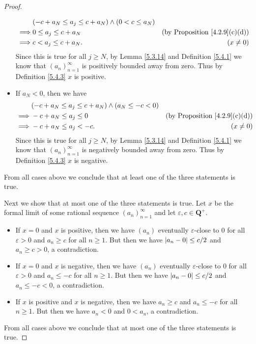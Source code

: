 \begin{proof}
\begin{itemize}
              \begin{align*}
                           & (-c + a_N \leq a_j \leq c + a_N) \land (0 < c \leq a_N)                                             \\
                  \implies & 0 \leq a_j \leq c + a_N                                 & \text{(by Proposition \ref{4.2.9}(c)(d))} \\
                  \implies & c < a_j \leq c + a_N.                                   & (x \neq 0)
              \end{align*}
              Since this is true for all \(j \geq N\), by Lemma \ref{5.3.14} and Definition \ref{5.4.1} we know that \((a_n)_{n = 1}^\infty\) is positively bounded away from zero.
              Thus by Definition \ref{5.4.3} \(x\) is positive.
        \item If \(a_N < 0\), then we have
              \begin{align*}
                           & (-c + a_N \leq a_j \leq c + a_N) \land (a_N \leq -c < 0)                                             \\
                  \implies & -c + a_N \leq a_j \leq 0                                 & \text{(by Proposition \ref{4.2.9}(c)(d))} \\
                  \implies & -c + a_N \leq a_j < -c.                                  & (x \neq 0)
              \end{align*}
              Since this is true for all \(j \geq N\), by Lemma \ref{5.3.14} and Definition \ref{5.4.1} we know that \((a_n)_{n = 1}^\infty\) is negatively bounded away from zero.
              Thus by Definition \ref{5.4.3} \(x\) is negative.
    \end{itemize}
    From all cases above we conclude that at least one of the three statements is true.

    Next we show that at most one of the three statements is true.
    Let \(x\) be the formal limit of some rational sequence \((a_n)_{n = 1}^{\infty}\) and let \(\varepsilon, c \in \mathbf{Q}^+\).
    \begin{itemize}
        \item If \(x = 0\) and \(x\) is positive, then we have \((a_n)\) eventually \(\varepsilon\)-close to \(0\) for all \(\varepsilon > 0\) and \(a_n \geq c\) for all \(n \geq 1\).
              But then we have \(\abs*{a_n - 0} \leq c / 2\) and \(a_n \geq c > 0\), a contradiction.
        \item If \(x = 0\) and \(x\) is negative, then we have \((a_n)\) eventually \(\varepsilon\)-close to \(0\) for all \(\varepsilon > 0\) and \(a_n \leq -c\) for all \(n \geq 1\).
              But then we have \(\abs*{a_n - 0} \leq c / 2\) and \(a_n \leq -c < 0\), a contradiction.
        \item If \(x\) is positive and \(x\) is negative, then we have \(a_n \geq c\) and \(a_n \leq -c\) for all \(n \geq 1\).
              But then we have \(a_n < 0\) and \(0 < a_n\), a contradiction.
    \end{itemize}
    From all cases above we conclude that at most one of the three statements is true.


\end{proof}
